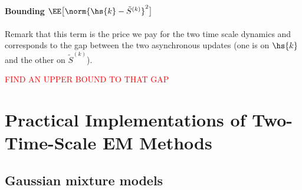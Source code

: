 \documentclass[11pt]{article}
\makeatletter
\renewenvironment{proof}[1][\proofname]{%
   \par\pushQED{\qed}\normalfont%
   \topsep6\p@\@plus6\p@\relax
   \trivlist\item[\hskip\labelsep\bfseries#1]%
   \ignorespaces
}{%
   \popQED\endtrivlist\@endpefalse
}
\theoremstyle{t}
\makeatother
\begin{document}
\begin{proof}
\paragraph{ Bounding $ \EE\big[\norm{ \hs{k} -  \tilde{S}^{(k)} }^2\big] $} Remark that this term is the price we pay for the two time scale dynamics and corresponds to the gap between the two asynchronous updates (one is on  $\hs{k}$ and the other on $ \tilde{S}^{(k)}$).

\textcolor{red}{FIND AN UPPER BOUND TO THAT GAP}

%

\end{proof}

\clearpage

\section{Practical Implementations of Two-Time-Scale EM Methods}
\subsection{Gaussian mixture models}\label{app:gmm_update}
\end{document}
